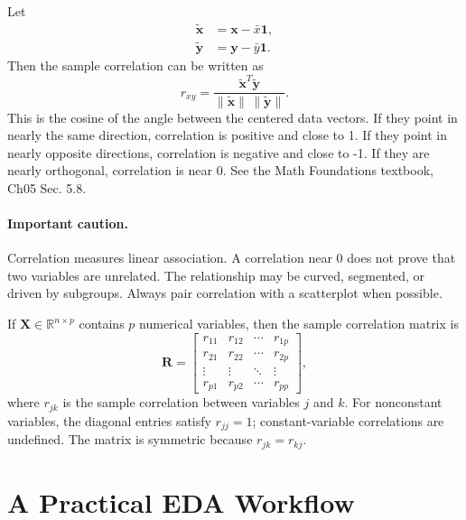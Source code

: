{Let
\begin{align*}
  \widetilde{\mathbf{x}} &= \mathbf{x}-\bar{x}\mathbf{1},\\
  \widetilde{\mathbf{y}} &= \mathbf{y}-\bar{y}\mathbf{1}.
\end{align*}
Then the sample correlation can be written as
\begin{equation}
  r_{xy}=\frac{\widetilde{\mathbf{x}}^T\widetilde{\mathbf{y}}}{\|\widetilde{\mathbf{x}}\|\,\|\widetilde{\mathbf{y}}\|}.
  \label{eq:ch4-correlation-vector-form}
\end{equation}
This is the cosine of the angle between the centered data vectors.  If they point in nearly the same direction, correlation is positive and close to 1.  If they point in nearly opposite directions, correlation is negative and close to -1.  If they are nearly orthogonal, correlation is near 0.  See the Math Foundations textbook, Ch05 Sec. 5.8.

\paragraph{Important caution.}
Correlation measures linear association.  A correlation near 0 does not prove that two variables are unrelated.  The relationship may be curved, segmented, or driven by subgroups.  Always pair correlation with a scatterplot when possible.

If $\mathbf{X}\in\mathbb{R}^{n\times p}$ contains $p$ numerical variables, then the sample correlation matrix is
\begin{equation}
  \mathbf{R}=\begin{bmatrix}
    r_{11} & r_{12} & \cdots & r_{1p}\\
    r_{21} & r_{22} & \cdots & r_{2p}\\
    \vdots & \vdots & \ddots & \vdots\\
    r_{p1} & r_{p2} & \cdots & r_{pp}
  \end{bmatrix},
  \label{eq:ch4-correlation-matrix}
\end{equation}
where $r_{jk}$ is the sample correlation between variables $j$ and $k$.  For nonconstant variables, the diagonal entries satisfy $r_{jj}=1$; constant-variable correlations are undefined.  The matrix is symmetric because $r_{jk}=r_{kj}$.

\section{A Practical EDA Workflow}

}
